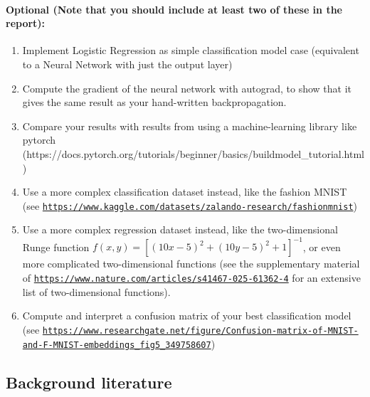\documentclass[%
oneside,                 %
final,                   %
10pt]{article}
\begin{document}
\paragraph{Optional (Note that you should include at least two of these in the report):}
\begin{enumerate}
\item Implement Logistic Regression as simple classification model case (equivalent to a Neural Network with just the output layer)

\item Compute the gradient of the neural network with autograd, to show that it gives the same result as your hand-written backpropagation.

\item Compare your results with results from using a machine-learning library like pytorch (https://docs.pytorch.org/tutorials/beginner/basics/buildmodel_tutorial.html)

\item Use a more complex classification dataset instead, like the fashion MNIST (see \href{{https://www.kaggle.com/datasets/zalando-research/fashionmnist}}{\nolinkurl{https://www.kaggle.com/datasets/zalando-research/fashionmnist}})

\item Use a more complex regression dataset instead, like the two-dimensional Runge function $f(x,y)=\left[(10x - 5)^2 + (10y - 5)^2 + 1 \right]^{-1}$, or even more complicated two-dimensional functions (see the supplementary material of \href{{https://www.nature.com/articles/s41467-025-61362-4}}{\nolinkurl{https://www.nature.com/articles/s41467-025-61362-4}} for an extensive list of two-dimensional functions). 

\item Compute and interpret a confusion matrix of your best classification model (see \href{{https://www.researchgate.net/figure/Confusion-matrix-of-MNIST-and-F-MNIST-embeddings_fig5_349758607}}{\nolinkurl{https://www.researchgate.net/figure/Confusion-matrix-of-MNIST-and-F-MNIST-embeddings_fig5_349758607}})
\end{enumerate}

\noindent
\subsection*{Background literature}
\end{document}
